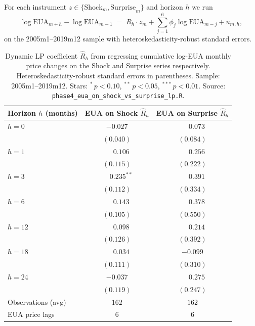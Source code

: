 For each instrument $z \in \{\text{Shock}_m, \text{Surprise}_m\}$ and horizon $h$ we run
\begin{equation}
    \log \text{EUA}_{m+h} - \log \text{EUA}_{m-1} \;=\; R_h \cdot z_m + \sum_{j=1}^{6} \phi_j \log \text{EUA}_{m-j} + u_{m, h},
\end{equation}
on the 2005m1--2019m12 sample with heteroskedasticity-robust standard errors.

\begin{table}[H]
    \centering
    \caption{Dynamic LP coefficient $\hat R_h$ from regressing cumulative log-EUA monthly price changes on the \citet{kanzig2023unequal} Shock and Surprise series respectively. Heteroskedasticity-robust standard errors in parentheses. Sample: 2005m1--2019m12. Stars: $^{*}\,p<0.10$, $^{**}\,p<0.05$, $^{***}\,p<0.01$. Source: \texttt{phase4\_eua\_on\_shock\_vs\_surprise\_lp.R}.}
    \label{tab:app_rh}
    \begin{tabular}{lcc}
        \toprule
        Horizon $h$ (months) & EUA on Shock $\hat R_h$ & EUA on Surprise $\hat R_h$ \\
        \midrule
        $h = 0$  & $-0.027$            & $\phantom{-}0.073$  \\
                 & $(0.040)$           & $(0.084)$           \\
        $h = 1$  & $\phantom{-}0.106$  & $\phantom{-}0.256$  \\
                 & $(0.115)$           & $(0.222)$           \\
        $h = 3$  & $\phantom{-}0.235^{**}$ & $\phantom{-}0.391$  \\
                 & $(0.112)$           & $(0.334)$           \\
        $h = 6$  & $\phantom{-}0.143$  & $\phantom{-}0.378$  \\
                 & $(0.105)$           & $(0.550)$           \\
        $h = 12$ & $\phantom{-}0.098$  & $\phantom{-}0.214$  \\
                 & $(0.126)$           & $(0.392)$           \\
        $h = 18$ & $\phantom{-}0.034$  & $-0.099$            \\
                 & $(0.111)$           & $(0.310)$           \\
        $h = 24$ & $-0.037$            & $\phantom{-}0.275$  \\
                 & $(0.119)$           & $(0.247)$           \\
        \midrule
        Observations (avg) & $162$               & $162$               \\
        EUA price lags     & 6                   & 6                   \\
        \bottomrule
    \end{tabular}
\end{table}

